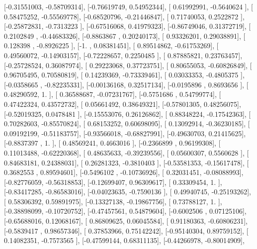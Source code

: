 \documentclass{article}
\begin{document}
       [-0.31551003, -0.58709314],
       [-0.76619749,  0.54952344],
       [ 0.61992991, -0.5640624 ],
       [ 0.58475252, -0.55569778],
       [-0.68520796, -0.21446847],
       [ 0.71740053,  0.2522872 ],
       [-0.25872831, -0.7313223 ],
       [-0.67516068,  0.41979323],
       [-0.86749046,  0.31372719],
       [ 0.2102849 , -0.44683326],
       [-0.8863867 ,  0.20240173],
       [ 0.93326201,  0.29038891],
       [ 0.128398  , -0.8926225 ],
       [-1.        ,  0.08381451],
       [ 0.89514862, -0.61753269],
       [ 0.49560072, -0.14903157],
       [-0.72228657,  0.2250485 ],
       [ 0.87885821,  0.23763457],
       [-0.25728524,  0.36087974],
       [ 0.29223068,  0.37723751],
       [ 0.80655053, -0.60826849],
       [ 0.96705495,  0.70580819],
       [ 0.14239369, -0.73339461],
       [ 0.03033353, -0.4805375 ],
       [-0.0358665 , -0.82235331],
       [-0.00136168,  0.32517134],
       [-0.0195896 ,  0.8693656 ],
       [ 0.48290592,  1.        ],
       [ 0.36588687, -0.07231767],
       [-0.5751686 ,  0.54799774],
       [ 0.47422324,  0.43572732],
       [ 0.05661492,  0.38649321],
       [-0.57801305,  0.48256075],
       [-0.52019325,  0.0478481 ],
       [-0.15553076,  0.26126862],
       [ 0.88348224, -0.17542363],
       [ 0.70282603, -0.85570824],
       [ 0.68153252,  0.60698095],
       [ 0.13092914, -0.36230185],
       [ 0.09192199, -0.51183757],
       [-0.93566018, -0.68827991],
       [-0.49630703,  0.21415625],
       [-0.8837397 ,  1.        ],
       [ 0.48569241,  0.4663016 ],
       [-0.2366899 ,  0.96199308],
       [ 0.11013488, -0.62220368],
       [ 0.48635633, -0.39239556],
       [ 0.05600307,  0.5560628 ],
       [ 0.84683181,  0.24388031],
       [ 0.26281323, -0.3810403 ],
       [-0.53581353, -0.15617478],
       [ 0.3682553 ,  0.89594601],
       [-0.5496102 , -0.10736926],
       [ 0.32031451, -0.08088993],
       [-0.82776059, -0.56318853],
       [-0.12699407,  0.96309617],
       [ 0.33309454,  1.        ],
       [-0.83417285, -0.86583016],
       [-0.04023635, -0.7590136 ],
       [ 0.49940745, -0.25193262],
       [ 0.58306392,  0.59891975],
       [-0.13327138, -0.19867756],
       [ 0.73788127,  1.        ],
       [-0.38898099, -0.10720752],
       [-0.47457561,  0.54879604],
       [-0.6002506 ,  0.07125106],
       [-0.65688016,  0.12068167],
       [ 0.86809625,  0.06045584],
       [ 0.91180363, -0.60806231],
       [-0.5839417 ,  0.98657346],
       [ 0.37853966,  0.75142242],
       [-0.95140304,  0.89759152],
       [ 0.14082351, -0.7573565 ],
       [-0.47599144,  0.68311135],
       [-0.44266978, -0.80014909],
\end{document}
